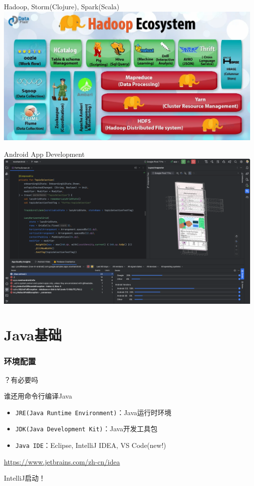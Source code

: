 \documentclass[UTF8, 16pt]{beamer}
\begin{document}
\begin{frame}
    \centering
    \textcolor{sufered}{Hadoop, Storm(Clojure), Spark(Scala)}
    \includegraphics[width=0.95\linewidth]{ch1/hadoop.png}
\end{frame}

\begin{frame}
    \centering
    \textcolor{sufered}{Android App Development}
    \includegraphics[width=0.95\linewidth]{ch1/as.png}
\end{frame}

\section{Java基础}
\begin{frame}
    \frametitle{环境配置}
    \textcolor{sufered}{？有必要吗}

    \textcolor{sufered}{谁还用命令行编译Java}

    \begin{itemize}
        \item \texttt{JRE(Java Runtime Environment)}：Java运行时环境
        \item \texttt{JDK(Java Development Kit)}：Java开发工具包
        \item \texttt{Java IDE}：Eclipse, IntelliJ IDEA, VS Code(new!)
    \end{itemize}

    \url{https://www.jetbrains.com/zh-cn/idea}

    \textcolor{sufered}{IntelliJ启动！}
\end{frame}
\end{document}
